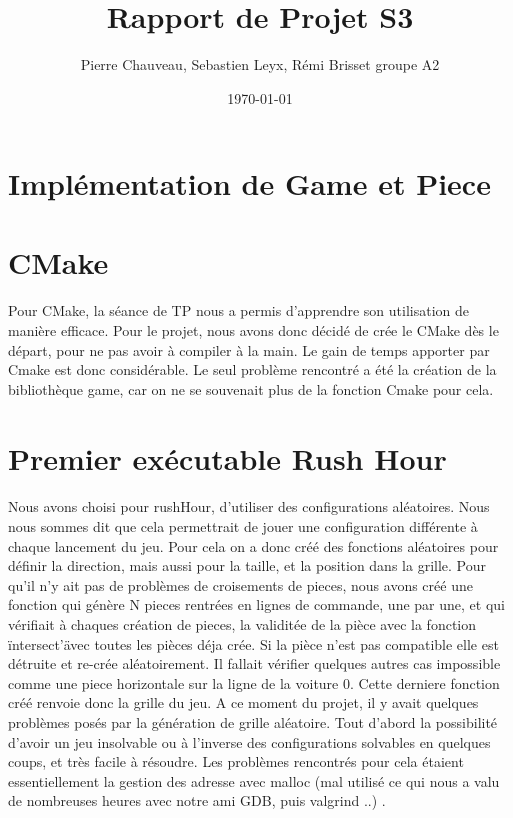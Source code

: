 \documentclass {article}
\title{Rapport de Projet S3}
\date\today
\author{Pierre Chauveau, Sebastien Leyx, Rémi Brisset groupe A2}
\begin{document}
\maketitle
\section{Implémentation de Game et Piece}
\paragraph{}



\section{CMake}
\paragraph{}
Pour CMake, la séance de TP nous a permis d'apprendre son utilisation de manière efficace. Pour le projet, nous avons donc décidé de crée le CMake dès le départ, pour ne pas avoir à compiler à la main. Le gain de temps apporter par Cmake est donc considérable. Le seul problème rencontré a été la création de la bibliothèque game, car on ne se souvenait plus de la fonction Cmake pour cela. 

\section{Premier exécutable Rush Hour}
\paragraph{}
Nous avons choisi pour rushHour, d'utiliser des configurations aléatoires. Nous nous sommes dit que cela permettrait de jouer une configuration différente à chaque lancement du jeu. Pour cela on a donc créé des fonctions aléatoires pour définir la direction, mais aussi pour la taille, et la position dans la grille. Pour qu'il n'y ait pas de problèmes de croisements de pieces, nous avons créé une fonction qui génère N pieces rentrées en lignes de commande, une par une, et qui vérifiait à chaques création de pieces, la validitée de la pièce avec la fonction \"intersect'\" avec toutes les pièces déja crée. Si la pièce n'est pas compatible elle est détruite et re-crée aléatoirement. Il fallait vérifier quelques autres cas impossible comme une piece horizontale sur la ligne de la voiture 0. Cette derniere fonction créé renvoie donc la grille du jeu. A ce moment du projet, il y avait quelques problèmes posés par la génération de grille aléatoire. Tout d'abord la possibilité d'avoir un jeu insolvable ou à l'inverse des configurations solvables en quelques coups, et très facile à résoudre. Les problèmes rencontrés pour cela étaient essentiellement la gestion des adresse avec malloc (mal utilisé ce qui nous a valu de nombreuses heures avec notre ami GDB, puis valgrind ..) .
\end{document}

